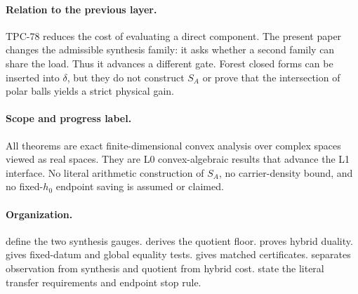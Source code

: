 \paragraph{Relation to the previous layer.}
TPC-78 reduces the cost of evaluating a direct component.  The present
paper changes the admissible synthesis family: it asks whether a second
family can share the load.  Thus it advances a different gate.  Forest
closed forms can be inserted into \(\delta\), but they do not construct
\(S_A\) or prove that the intersection of polar balls yields a strict
physical gain.

\paragraph{Scope and progress label.}
All theorems are exact finite-dimensional convex analysis over complex
spaces viewed as real spaces.  They are L0 convex-algebraic results that
advance the L1 interface.  No literal arithmetic construction of
\(S_A\), no carrier-density bound, and no fixed-\(h_0\) endpoint saving
is assumed or claimed.

\paragraph{Organization.}
 define the two synthesis gauges.
 derives the quotient floor.
 proves hybrid duality.
 gives fixed-datum and global equality tests.
 gives matched certificates.
 separates observation from synthesis and
quotient from hybrid cost.   state the
literal transfer requirements and endpoint stop rule.
